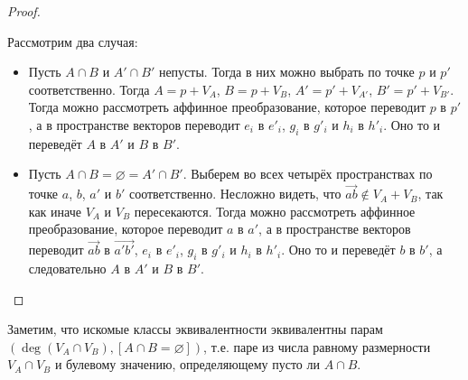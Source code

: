 \documentclass[12pt,a4paper]{article}
\begin{document}
\begin{problem}{97}
\begin{proof}
\begin{itemize}
                    Рассмотрим два случая:
                    \begin{itemize}
                        \item Пусть $A \cap B$ и $A' \cap B'$ непусты. Тогда в них можно выбрать по точке $p$ и $p'$ соответственно. Тогда $A = p + V_A$, $B = p + V_B$, $A' = p' + V_{A'}$, $B' = p' + V_{B'}$. Тогда можно рассмотреть аффинное преобразование, которое переводит $p$ в $p'$, а в пространстве векторов переводит $e_i$ в $e'_i$, $g_i$ в $g'_i$ и $h_i$ в $h'_i$. Оно то и переведёт $A$ в $A'$ и $B$ в $B'$.

                        \item Пусть $A \cap B = \varnothing = A' \cap B'$. Выберем во всех четырёх пространствах по точке $a$, $b$, $a'$ и $b'$ соответственно. Несложно видеть, что $\overrightarrow{ab} \notin V_A + V_B$, так как иначе $V_A$ и $V_B$ пересекаются. Тогда можно рассмотреть аффинное преобразование, которое переводит $a$ в $a'$, а в пространстве векторов переводит $\overrightarrow{ab}$ в $\overrightarrow{a'b'}$, $e_i$ в $e'_i$, $g_i$ в $g'_i$ и $h_i$ в $h'_i$. Оно то и переведёт $b$ в $b'$, а следовательно $A$ в $A'$ и $B$ в $B'$.
                    \end{itemize}
            \end{itemize}
        \end{proof}

        Заметим, что искомые классы эквивалентности эквивалентны парам $(\deg(V_A \cap V_B), [A \cap B = \varnothing])$, т.е. паре из числа равному размерности $V_A \cap V_B$ и булевому значению, определяющему пусто ли $A \cap B$.
        

\end{problem}
\end{document}

